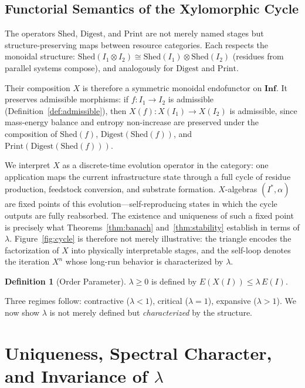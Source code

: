 \documentclass[10pt,twocolumn]{article}
\theoremstyle{plain}
\theoremstyle{definition}
\newtheorem{definition}[theorem]{Definition}
\theoremstyle{remark}
\begin{document}
\subsection{Functorial Semantics of the Xylomorphic Cycle}

The operators $\mathrm{Shed}$, $\mathrm{Digest}$, and $\mathrm{Print}$
are not merely named stages but structure-preserving maps between
resource categories. Each respects the monoidal structure:
$\mathrm{Shed}(I_1 \otimes I_2) \cong \mathrm{Shed}(I_1) \otimes
\mathrm{Shed}(I_2)$ (residues from parallel systems compose), and
analogously for $\mathrm{Digest}$ and $\mathrm{Print}$.

Their composition $X$ is therefore a symmetric monoidal endofunctor on
$\mathbf{Inf}$. It preserves admissible morphisms: if $f : I_1 \to I_2$
is admissible (Definition~\ref{def:admissible}), then $X(f) : X(I_1)
\to X(I_2)$ is admissible, since mass-energy balance and entropy
non-increase are preserved under the composition of
$\mathrm{Shed}(f)$, $\mathrm{Digest}(\mathrm{Shed}(f))$, and
$\mathrm{Print}(\mathrm{Digest}(\mathrm{Shed}(f)))$.

We interpret $X$ as a discrete-time evolution operator in the
category: one application maps the current infrastructure state
through a full cycle of residue production, feedstock conversion, and
substrate formation. $X$-algebras $(I^*, \alpha)$ are fixed points of
this evolution---self-reproducing states in which the cycle outputs
are fully reabsorbed. The existence and uniqueness of such a fixed
point is precisely what Theorems~\ref{thm:banach} and~\ref{thm:stability}
establish in terms of $\lambda$. Figure~\ref{fig:cycle} is therefore
not merely illustrative: the triangle encodes the factorization of $X$
into physically interpretable stages, and the self-loop denotes the
iteration $X^n$ whose long-run behavior is characterized by $\lambda$.

\begin{definition}[Order Parameter]
$\lambda \geq 0$ is defined by $E(X(I)) \leq \lambda\, E(I).$
\end{definition}

Three regimes follow: contractive ($\lambda < 1$), critical
($\lambda = 1$), expansive ($\lambda > 1$). We now show $\lambda$ is
not merely defined but \emph{characterized} by the structure.

\section{Uniqueness, Spectral Character, and Invariance of $\lambda$}
\label{sec:invariance}
\end{document}
